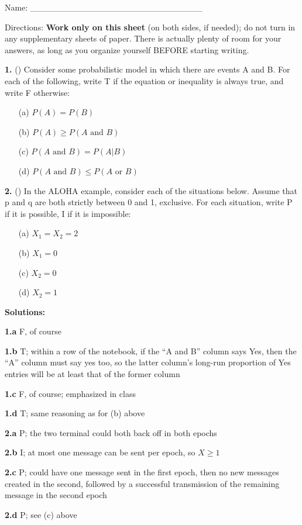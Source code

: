 \documentclass{article}
\begin{document}
Name: \_\_\_\_\_\_\_\_\_\_\_\_\_\_\_\_\_\_\_\_\_\_\_\_\_\_\_\_

Directions: {\bf \Large Work only on this sheet} (on both sides, if
needed); do not turn in any supplementary sheets of paper. There is
actually plenty of room for your answers, as long as you organize
yourself BEFORE starting writing.


{\bf 1.} () Consider some probabilistic model in which there are events
A and B.  For each of the following, write T if the equation or
inequality is always true, and write F otherwise:

\begin{itemize}

\item [(a)] $P(A) = P(B)$

\item [(b)] $P(A) \geq P(A \textrm{ and } B)$

\item [(c)] $P(A \textrm{ and }  B) = P(A | B)$

\item [(d)] $P(A \textrm{ and } B) \leq P(A \textrm{ or } B)$

\end{itemize}

{\bf 2.} () In the ALOHA example, consider each of the situations below.
Assume that p and q are both strictly between 0 and 1, exclusive.  For
each situation, write P if it is possible, I if it is impossible:

\begin{itemize}

\item [(a)] $X_1 = X_2 = 2$

\item [(b)] $X_1 = 0$

\item [(c)] $X_2 = 0$

\item [(d)] $X_2 = 1$

\end{itemize}

{\bf Solutions:}

{\bf 1.a} F, of course

{\bf 1.b} T; within a row of the notebook, if the ``A and B'' column
says Yes, then the ``A'' column must say yes too, so the latter column's
long-run proportion of Yes entries will be at least that of the former
column

{\bf 1.c} F, of course; emphasized in class

{\bf 1.d} T; same reasoning as for (b) above

{\bf 2.a} P; the two terminal could both back off in both epochs

{\bf 2.b} I; at most one message can be sent per epoch, so $X \geq 1$

{\bf 2.c} P; could have one message sent in the first epoch, then no new
messages created in the second, followed by a successful transmission of
the remaining message in the second epoch

{\bf 2.d} P; see (c) above
\end{document}

